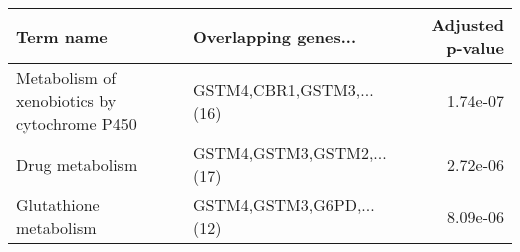 \begin{tabular}{llr}
\toprule
                                   Term name &      Overlapping genes... &  Adjusted p-value \\
\midrule
Metabolism of xenobiotics by cytochrome P450 &  GSTM4,CBR1,GSTM3,...(16) &          1.74e-07 \\
                             Drug metabolism & GSTM4,GSTM3,GSTM2,...(17) &          2.72e-06 \\
                      Glutathione metabolism &  GSTM4,GSTM3,G6PD,...(12) &          8.09e-06 \\
\bottomrule
\end{tabular}
